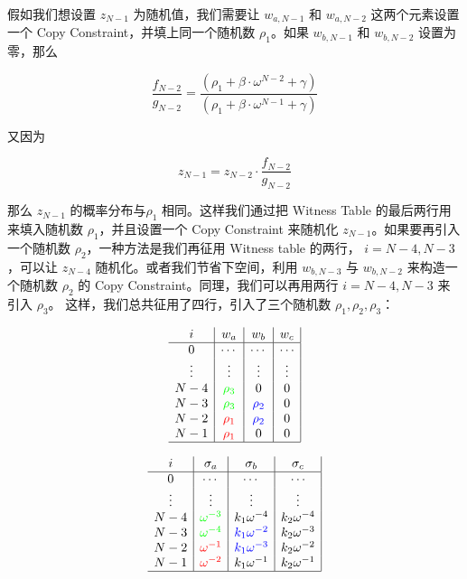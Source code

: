 假如我们想设置 \(z_{N-1}\) 为随机值，我们需要让 \(w_{a,N-1}\) 和
\(w_{a,N-2}\) 这两个元素设置一个 Copy Constraint，并填上同一个随机数
\(\rho_1\)。如果 \(w_{b,N-1}\) 和 \(w_{b,N-2}\) 设置为零，那么

\[
\frac{f_{N-2}}{g_{N-2}} = \frac{(\rho_1 + \beta \cdot \omega^{N-2} + \gamma)}{(\rho_1 + \beta \cdot \omega^{N-1}+ \gamma)}
\]

又因为

\[
z_{N-1} = z_{N-2}\cdot \frac{f_{N-2}}{g_{N-2}}
\]

那么 \(z_{N-1}\) 的概率分布与\(\rho_1\) 相同。这样我们通过把 Witness
Table 的最后两行用来填入随机数 \(\rho_1\)，并且设置一个 Copy Constraint
来随机化 \(z_{N-1}\)。如果要再引入一个随机数
\(\rho_2\)，一种方法是我们再征用 Witness table 的两行，
\(i=N-4, N-3\)，可以让 \(z_{N-4}\) 随机化。或者我们节省下空间，利用
\(w_{b,N-3}\) 与 \(w_{b,N-2}\) 来构造一个随机数 \(\rho_2\) 的 Copy
Constraint。同理，我们可以再用两行 \(i=N-4, N-3\) 来引入 \(\rho_3\)。
这样，我们总共征用了四行，引入了三个随机数 \(\rho_1,\rho_2,\rho_3\)：

\[
\begin{array}{c|c|c|c|}
i & w_a & w_b & w_c \\
\hline
0 & \cdots & \cdots & \cdots \\
\vdots & \vdots & \vdots & \vdots \\
N-4 & {\color{green}\rho_3} & 0& 0\\
N-3 & {\color{green}\rho_3} & {\color{blue}\rho_2} & 0\\
N-2 & {\color{red}\rho_1} & {\color{blue}\rho_2} & 0\\
N-1 & {\color{red}\rho_1} & 0 & 0\\
\hline
\end{array}
\]

\[
\begin{array}{c|c|c|c|}
i & \sigma_a & \sigma_b & \sigma_c \\
\hline
0 & \cdots & \cdots & \cdots \\
\vdots & \vdots & \vdots & \vdots \\
N-4 & {\color{green}\omega^{-3}} & k_1\omega^{-4}& k_2\omega^{-4}\\
N-3 & {\color{green}\omega^{-4}} & {\color{blue}k_1\omega^{-2}} & k_2\omega^{-3}\\
N-2 & {\color{red}\omega^{-1}} & {\color{blue}k_1\omega^{-3}} & k_2\omega^{-2}\\
N-1 & {\color{red}\omega^{-2}} & k_1\omega^{-1} & k_2\omega^{-1}\\
\hline
\end{array}
\]

